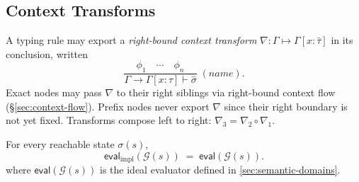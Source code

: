 \subsection*{Context Transforms}

A typing rule may export a \emph{right-bound context transform}
$\nabla : \Gamma \mapsto \Gamma[x:\hat\tau]$ in its conclusion, written
\[
	\frac{\phi_1 \quad \cdots \quad \phi_n}
	{\Gamma \to \Gamma[x:\hat\tau] \vdash \hat\sigma}
	\;(\mathit{name}).
\]
Exact nodes may pass $\nabla$ to their right siblings via right-bound
context flow (\S\ref{sec:context-flow}). Prefix nodes never export $\nabla$
since their right boundary is not yet fixed. Transforms compose left to right:
$\nabla_3 = \nabla_2 \circ \nabla_1$.

\begin{theorem}
	\label{thm:typing-realizable}
	For every reachable state $\sigma(s)$,
	\[
		\mathsf{eval}_{\mathrm{impl}}(\mathcal{G}(s))
		\;=\;
		\mathsf{eval}(\mathcal{G}(s)).
	\]
	where $\mathsf{eval}(\mathcal{G}(s))$ is the ideal evaluator defined in \ref{sec:semantic-domains}.
\end{theorem}

